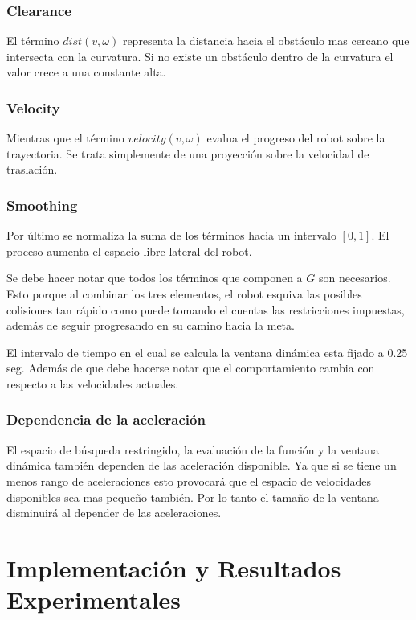\documentclass[12pt]{article}
\begin{document}
\subsubsection{Clearance}
El término $dist(v, \omega)$ representa la distancia hacia el obstáculo mas cercano que intersecta con la curvatura. Si no existe un obstáculo dentro de la curvatura el valor crece a una constante alta.

\subsubsection{Velocity}
Mientras que el término $velocity(v, \omega)$ evalua el progreso del robot sobre la trayectoria. Se trata simplemente de una proyección sobre la velocidad de traslación.

\subsubsection{Smoothing}
Por último se normaliza la suma de los términos hacia un intervalo $[0,  1]$. El proceso aumenta el espacio libre lateral del robot.

Se debe hacer notar que todos los términos que componen a $G$ son necesarios. Esto porque al combinar los tres elementos, el robot esquiva las posibles colisiones tan rápido como puede tomando el cuentas las restricciones impuestas, además de seguir progresando en su camino hacia la meta.

El intervalo de tiempo en el cual se calcula la ventana dinámica esta fijado a 0.25 seg. Además de que debe hacerse notar que el comportamiento cambia con respecto a las velocidades actuales.

\subsubsection{Dependencia de la aceleración}
El espacio de búsqueda restringido, la evaluación de la función y la ventana dinámica también dependen de las aceleración disponible. Ya que si se tiene un menos rango de aceleraciones esto provocará que el espacio de velocidades disponibles sea mas pequeño también. Por lo tanto el tamaño de la ventana disminuirá al depender de las aceleraciones.

\section{Implementación y Resultados Experimentales}
\end{document}
